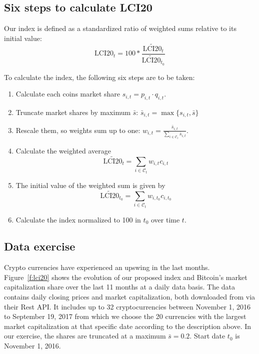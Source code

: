 \documentclass[11pt]{article}
\begin{document}
\subsection{Six steps to calculate LCI20}

Our index is defined as a standardized ratio of weighted sums relative to its initial value:
\begin{equation}
  \text{LCI20}_t = 100 * \frac{\widetilde{\text{LCI20}}_t}{\widetilde{\text{LCI20}}_{t_0}}
\end{equation}

\noindent To calculate the index, the following six steps are to be taken:
\begin{enumerate}
  \item Calculate each coins market share $s_{i,t} = p_{i,t} \cdot q_{i,t}$.
  \item Truncate market shares by maximum $\bar s$: $\bar s_{i,t} = \max\{ s_{i,t}, \bar s\}$
  \item Rescale them, so weights sum up to one: $w_{i,t} = \frac{\bar s_{i,t}}{\sum_{i \in \mathcal{C}_t} \bar s_{i,t}}$. %
  \item Calculate the weighted average $$\widetilde{\text{LCI20}}_t = \sum_{i \in \mathcal{C}_{t}} w_{i,t} c_{i,t}$$
  \item The initial value of the weighted sum is given by $$\widetilde{\text{LCI20}}_{t_0} = \sum_{i \in \mathcal{C}_{t}} w_{i,t_0} c_{i,t_0}$$
  \item Calculate the index normalized to 100 in $t_0$ over time $t$. %
\end{enumerate}


\subsection{Data exercise}

Crypto currencies have experienced an upswing in the last months.
Figure~\ref{f:lci20} shows the evolution of our proposed index and Bitcoin's market capitalization share over the last 11 months at a daily data basis.
The data contains daily closing prices and market capitalization, both downloaded from \citeauthor{CoinCap} via their Rest API.
It includes up to 32 cryptocurrencies between November 1, 2016 to September 19, 2017 from which we choose the 20 currencies with the largest market capitalization at that specific date according to the description above.
In our exercise, the shares are truncated at a maximum $\bar s = 0.2$.
Start date $t_0$ is November 1, 2016.
\end{document}
